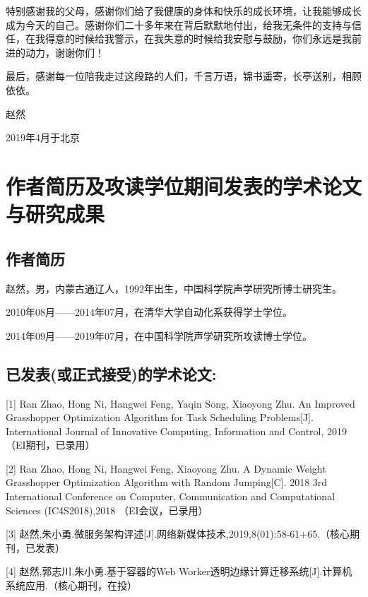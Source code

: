 特别感谢我的父母，感谢你们给了我健康的身体和快乐的成长环境，让我能够成长成为今天的自己。感谢你们二十多年来在背后默默地付出，给我无条件的支持与信任，在我得意的时候给我警示，在我失意的时候给我安慰与鼓励，你们永远是我前进的动力，谢谢你们！

最后，感谢每一位陪我走过这段路的人们，千言万语，锦书遥寄，长亭送别，相顾依依。

\begin{flushright}

    赵然

    2019年4月于北京


\end{flushright}


\chapter{作者简历及攻读学位期间发表的学术论文与研究成果}


\section*{作者简历}

赵然，男，内蒙古通辽人，1992年出生，中国科学院声学研究所博士研究生。

2010年08月——2014年07月，在清华大学自动化系获得学士学位。

2014年09月——2019年07月，在中国科学院声学研究所攻读博士学位。


\section*{已发表(或正式接受)的学术论文:}

[1] Ran Zhao, Hong Ni, Hangwei Feng, Yaqin Song, Xiaoyong Zhu. An Improved Grasshopper Optimization Algorithm for Task Scheduling Problems[J]. International Journal of Innovative Computing, Information and Control, 2019（EI期刊，已录用）

[2] Ran Zhao, Hong Ni, Hangwei Feng, Xiaoyong Zhu. A Dynamic Weight Grasshopper Optimization Algorithm with Random Jumping[C]. 2018 3rd International Conference on Computer, Communication and Computational Sciences (IC4S2018),2018 （EI会议，已录用）

[3] 赵然,朱小勇.微服务架构评述[J].网络新媒体技术,2019,8(01):58-61+65.（核心期刊，已发表）

[4] 赵然,郭志川,朱小勇.基于容器的Web Worker透明边缘计算迁移系统[J].计算机系统应用.（核心期刊，在投）

